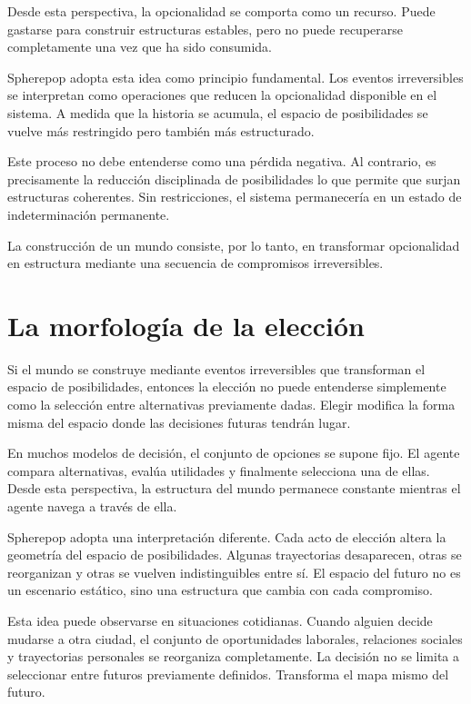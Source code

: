 \documentclass[12pt]{article}
\begin{document}
Desde esta perspectiva, la opcionalidad se comporta como un recurso. Puede gastarse para construir estructuras estables, pero no puede recuperarse completamente una vez que ha sido consumida.

Spherepop adopta esta idea como principio fundamental. Los eventos irreversibles se interpretan como operaciones que reducen la opcionalidad disponible en el sistema. A medida que la historia se acumula, el espacio de posibilidades se vuelve más restringido pero también más estructurado.

Este proceso no debe entenderse como una pérdida negativa. Al contrario, es precisamente la reducción disciplinada de posibilidades lo que permite que surjan estructuras coherentes. Sin restricciones, el sistema permanecería en un estado de indeterminación permanente.

La construcción de un mundo consiste, por lo tanto, en transformar opcionalidad en estructura mediante una secuencia de compromisos irreversibles.

\section{La morfología de la elección}

Si el mundo se construye mediante eventos irreversibles que transforman el espacio de posibilidades, entonces la elección no puede entenderse simplemente como la selección entre alternativas previamente dadas. Elegir modifica la forma misma del espacio donde las decisiones futuras tendrán lugar.

En muchos modelos de decisión, el conjunto de opciones se supone fijo. El agente compara alternativas, evalúa utilidades y finalmente selecciona una de ellas. Desde esta perspectiva, la estructura del mundo permanece constante mientras el agente navega a través de ella.

Spherepop adopta una interpretación diferente. Cada acto de elección altera la geometría del espacio de posibilidades. Algunas trayectorias desaparecen, otras se reorganizan y otras se vuelven indistinguibles entre sí. El espacio del futuro no es un escenario estático, sino una estructura que cambia con cada compromiso.

Esta idea puede observarse en situaciones cotidianas. Cuando alguien decide mudarse a otra ciudad, el conjunto de oportunidades laborales, relaciones sociales y trayectorias personales se reorganiza completamente. La decisión no se limita a seleccionar entre futuros previamente definidos. Transforma el mapa mismo del futuro.
\end{document}
